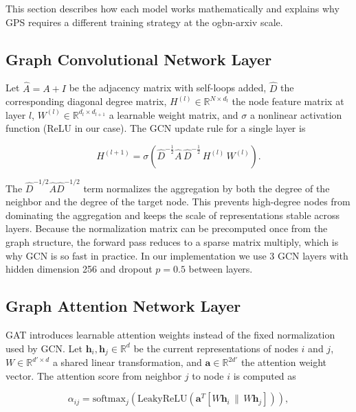 \documentclass[conference]{IEEEtran}
\begin{document}
This section describes how each model works mathematically and explains why GPS requires
a different training strategy at the ogbn-arxiv scale.

\subsection{Graph Convolutional Network Layer}

Let $\hat{A} = A + I$ be the adjacency matrix with self-loops added, $\hat{D}$ the
corresponding diagonal degree matrix, $H^{(l)} \in \mathbb{R}^{N \times d_l}$ the node
feature matrix at layer $l$, $W^{(l)} \in \mathbb{R}^{d_l \times d_{l+1}}$ a learnable
weight matrix, and $\sigma$ a nonlinear activation function (ReLU in our case). The GCN
update rule for a single layer is

\begin{equation}
H^{(l+1)} = \sigma\!\left(\hat{D}^{-\frac{1}{2}}\hat{A}\,\hat{D}^{-\frac{1}{2}}\,H^{(l)}\,W^{(l)}\right).
\label{eq:gcn}
\end{equation}

The $\hat{D}^{-1/2}\hat{A}\hat{D}^{-1/2}$ term normalizes the aggregation by both the
degree of the neighbor and the degree of the target node. This prevents high-degree nodes
from dominating the aggregation and keeps the scale of representations stable across layers.
Because the normalization matrix can be precomputed once from the graph structure, the
forward pass reduces to a sparse matrix multiply, which is why GCN is so fast in practice.
In our implementation we use 3 GCN layers with hidden dimension 256 and dropout $p=0.5$
between layers.

\subsection{Graph Attention Network Layer}

GAT introduces learnable attention weights instead of the fixed normalization used by GCN.
Let $\mathbf{h}_i, \mathbf{h}_j \in \mathbb{R}^{d}$ be the current representations of
nodes $i$ and $j$, $W \in \mathbb{R}^{d' \times d}$ a shared linear transformation, and
$\mathbf{a} \in \mathbb{R}^{2d'}$ the attention weight vector. The attention score from
neighbor $j$ to node $i$ is computed as

\begin{equation}
\alpha_{ij} = \text{softmax}_j\!\left(\text{LeakyReLU}\!\left(\mathbf{a}^T
\!\left[W\mathbf{h}_i \,\|\, W\mathbf{h}_j\right]\right)\right),
\label{eq:gat}
\end{equation}
\end{document}
